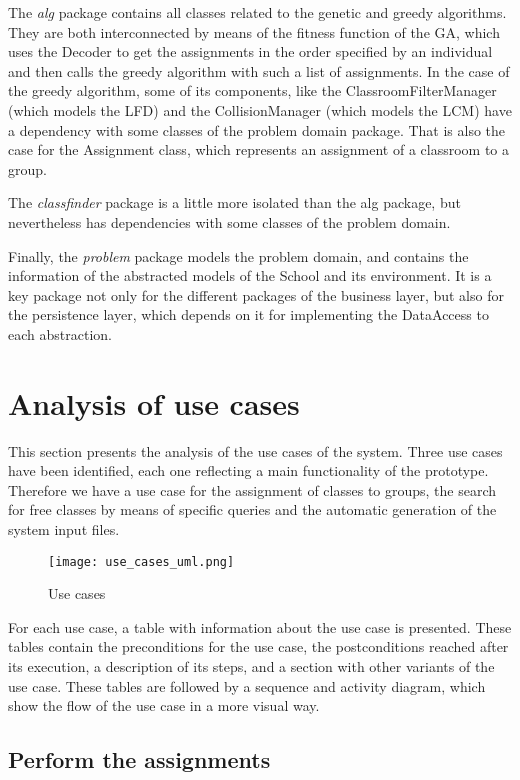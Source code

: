 The \textit{alg} package contains all classes related to the genetic and greedy algorithms. They are both interconnected by means of the fitness function of the GA, which uses the Decoder to get the assignments in the order specified by an individual and then calls the greedy algorithm with such a list of assignments. In the case of the greedy algorithm, some of its components, like the ClassroomFilterManager (which models the LFD) and the CollisionManager (which models the LCM) have a dependency with some classes of the problem domain package. That is also the case for the Assignment class, which represents an assignment of a classroom to a group.

The \textit{classfinder} package is a little more isolated than the alg package, but nevertheless has dependencies with some classes of the problem domain.

Finally, the \textit{problem} package models the problem domain, and contains the information of the abstracted models of the School and its environment. It is a key package not only for the different packages of the business layer, but also for the persistence layer, which depends on it for implementing the DataAccess to each abstraction.


\section{Analysis of use cases}

This section presents the analysis of the use cases of the system. Three use cases have been identified, each one reflecting a main functionality of the prototype. Therefore we have a use case for the assignment of classes to groups, the search for free classes by means of specific queries and the automatic generation of the system input files.

\begin{figure}[H]
    \caption{Use cases}
  \centering
  \texttt{[image: use\_cases\_uml.png]}
\end{figure}

For each use case, a table with information about the use case is presented. These tables contain the preconditions for the use case, the postconditions reached after its execution, a description of its steps, and a section with other variants of the use case. These tables are followed by a sequence and activity diagram, which show the flow of the use case in a more visual way.

\subsection{Perform the assignments}

